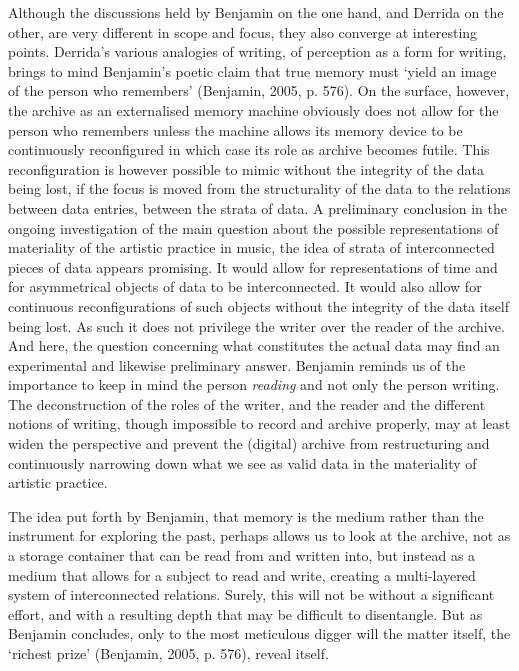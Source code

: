 Although the discussions held by Benjamin on the one hand, and Derrida
on the other, are very different in scope and focus, they also converge
at interesting points. Derrida's various analogies of writing, of
perception as a form for writing, brings to mind Benjamin's poetic claim
that true memory must `yield an image of the person who remembers'
(Benjamin, 2005, p. 576). On the surface, however, the archive as an
externalised memory machine obviously does not allow for the person who
remembers unless the machine allows its memory device to be continuously
reconfigured in which case its role as archive becomes futile. This
reconfiguration is however possible to mimic without the integrity of
the data being lost, if the focus is moved from the structurality of the
data to the relations between data entries, between the strata of data.
A preliminary conclusion in the ongoing investigation of the main
question about the possible representations of materiality of the
artistic practice in music, the idea of strata of interconnected pieces
of data appears promising. It would allow for representations of time
and for asymmetrical objects of data to be interconnected. It would also
allow for continuous reconfigurations of such objects without the
integrity of the data itself being lost. As such it does not privilege
the writer over the reader of the archive. And here, the question
concerning what constitutes the actual data may find an experimental and
likewise preliminary answer. Benjamin reminds us of the importance to
keep in mind the person \emph{reading} and not only the person writing.
The deconstruction of the roles of the writer, and the reader and the
different notions of writing, though impossible to record and archive
properly, may at least widen the perspective and prevent the (digital)
archive from restructuring and continuously narrowing down what we see
as valid data in the materiality of artistic practice.

The idea put forth by Benjamin, that memory is the medium rather than
the instrument for exploring the past, perhaps allows us to look at the
archive, not as a storage container that can be read from and written
into, but instead as a medium that allows for a subject to read and
write, creating a multi-layered system of interconnected relations.
Surely, this will not be without a significant effort, and with a
resulting depth that may be difficult to disentangle. But as Benjamin
concludes, only to the most meticulous digger will the matter itself,
the `richest prize' (Benjamin, 2005, p. 576), reveal itself.

